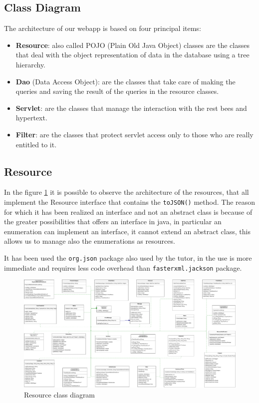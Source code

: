 \subsection{Class Diagram}

The architecture of our webapp is based on four principal items:
\begin{itemize}
    \item \textbf{Resource}: also called POJO (Plain Old Java Object) classes are the classes that deal with the object representation of data in the database using a tree hierarchy.
    \item \textbf{Dao} (Data Access Object): are the classes that take care of making the queries and saving the result of the queries in the resource classes.
    \item \textbf{Servlet}: are the classes that manage the interaction with the rest bees and hypertext.
    \item \textbf{Filter}: are the classes that protect servlet access only to those who are really entitled to it.
\end{itemize}

\subsection*{Resource}

In the figure \ref{fig:ResouceClassDiagram} it is possible to observe the 
architecture of the resources, that all implement the Resource interface 
that contains the \texttt{toJSON()} method. 
The reason for which it has been realized an interface and not an abstract 
class is because of the greater possibilities that offers an interface in 
java, in particular an enumeration can implement an interface, it cannot 
extend an abstract class, this allows us to manage also the enumerations 
as resources.

It has been used the \texttt{org.json} package also used by the tutor, in the 
use is more  immediate and requires less code overhead than 
\texttt{fasterxml.jackson} package.


\begin{figure}[H]
    \includegraphics[width=\textwidth,height=\textheight,keepaspectratio]{Schemas/resources.drawio.pdf}
    \caption{Resource class diagram}
    \label{fig:ResouceClassDiagram}
\end{figure}

